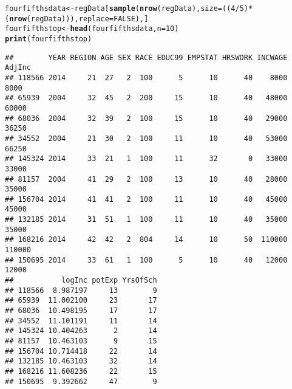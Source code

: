 \documentclass{article}\usepackage[]{graphicx}\usepackage[]{color}
\makeatletter
\newcommand{\hlnum}[1]{\textcolor[rgb]{0.686,0.059,0.569}{#1}}%
\newcommand{\hlopt}[1]{\textcolor[rgb]{0,0,0}{#1}}%
\newcommand{\hlstd}[1]{\textcolor[rgb]{0.345,0.345,0.345}{#1}}%
\newcommand{\hlkwb}[1]{\textcolor[rgb]{0.69,0.353,0.396}{#1}}%
\newcommand{\hlkwc}[1]{\textcolor[rgb]{0.333,0.667,0.333}{#1}}%
\newcommand{\hlkwd}[1]{\textcolor[rgb]{0.737,0.353,0.396}{\textbf{#1}}}%
\newenvironment{kframe}{%
 \def\at@end@of@kframe{}%
 \ifinner\ifhmode%
  \def\at@end@of@kframe{\end{minipage}}%
  \begin{minipage}{\columnwidth}%
 \fi\fi%
 \def\FrameCommand##1{\hskip\@totalleftmargin \hskip-\fboxsep
 \colorbox{shadecolor}{##1}\hskip-\fboxsep
     \hskip-\linewidth \hskip-\@totalleftmargin \hskip\columnwidth}%
 \MakeFramed {\advance\hsize-\width
   \@totalleftmargin\z@ \linewidth\hsize
   \@setminipage}}%
 {\par\unskip\endMakeFramed%
 \at@end@of@kframe}
\newenvironment{knitrout}{}{} %
\makeatother
\begin{document}
\begin{knitrout}\scriptsize
{}\color{fgcolor}\begin{kframe}
\begin{alltt}
\hlstd{fourfifthsdata} \hlkwb{<-} \hlstd{regData[}\hlkwd{sample}\hlstd{(}\hlkwd{nrow}\hlstd{(regData),}\hlkwc{size} \hlstd{=((}\hlnum{4}\hlopt{/}\hlnum{5}\hlstd{)} \hlopt{*} \hlstd{(}\hlkwd{nrow}\hlstd{(regData))),}\hlkwc{replace}\hlstd{=}\hlnum{FALSE}\hlstd{),]}
\hlstd{fourfifthstop} \hlkwb{<-} \hlkwd{head}\hlstd{(fourfifthsdata,} \hlkwc{n}\hlstd{=}\hlnum{10}\hlstd{)}
\hlkwd{print}\hlstd{(fourfifthstop)}
\end{alltt}
\begin{verbatim}
##        YEAR REGION AGE SEX RACE EDUC99 EMPSTAT HRSWORK INCWAGE AdjInc
## 118566 2014     21  27   2  100      5      10      40    8000   8000
## 65939  2004     32  45   2  200     15      10      40   48000  60000
## 68036  2004     32  39   2  100     15      10      40   29000  36250
## 34552  2004     21  30   2  100     11      10      40   53000  66250
## 145324 2014     33  21   1  100     11      32       0   33000  33000
## 81157  2004     41  29   2  100     13      10      40   28000  35000
## 156704 2014     41  41   2  100     11      10      40   45000  45000
## 132185 2014     31  51   1  100     11      10      40   35000  35000
## 168216 2014     42  42   2  804     14      10      50  110000 110000
## 150695 2014     33  61   1  100      5      10      40   12000  12000
##           logInc potExp YrsOfSch
## 118566  8.987197     13        9
## 65939  11.002100     23       17
## 68036  10.498195     17       17
## 34552  11.101191     11       14
## 145324 10.404263      2       14
## 81157  10.463103      9       15
## 156704 10.714418     22       14
## 132185 10.463103     32       14
## 168216 11.608236     22       15
## 150695  9.392662     47        9
\end{verbatim}
\end{kframe}
\end{knitrout}
\end{document}
